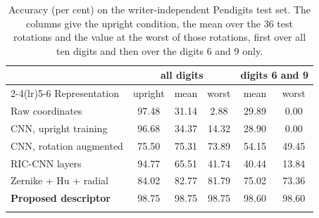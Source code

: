 \begin{table}[t]
\caption{Accuracy (per cent) on the writer-independent Pendigits test set. The
columns give the upright condition, the mean over the $36$ test rotations and the
value at the worst of those rotations, first over all ten digits and then over
the digits $6$ and $9$ only.}
\label{tab:main}
\begin{tabular}{lccccc}
\toprule
& \multicolumn{3}{c}{all digits} & \multicolumn{2}{c}{digits 6 and 9}\\
\cmidrule(lr){2-4}\cmidrule(lr){5-6}
Representation & upright & mean & worst & mean & worst\\
\midrule
Raw coordinates & 97.48 & 31.14 & 2.88 & 29.89 & 0.00 \\
CNN, upright training & 96.68 & 34.37 & 14.32 & 28.90 & 0.00 \\
CNN, rotation augmented & 75.50 & 75.31 & 73.89 & 54.15 & 49.45 \\
RIC-CNN layers~\cite{riccnn} & 94.77 & 65.51 & 41.74 & 40.44 & 13.84 \\
Zernike + Hu + radial & 84.02 & 82.77 & 81.79 & 75.02 & 73.36 \\
\midrule
\textbf{Proposed descriptor} & 98.75 & 98.75 & 98.75 & 98.60 & 98.60 \\
\botrule
\end{tabular}
\end{table}
